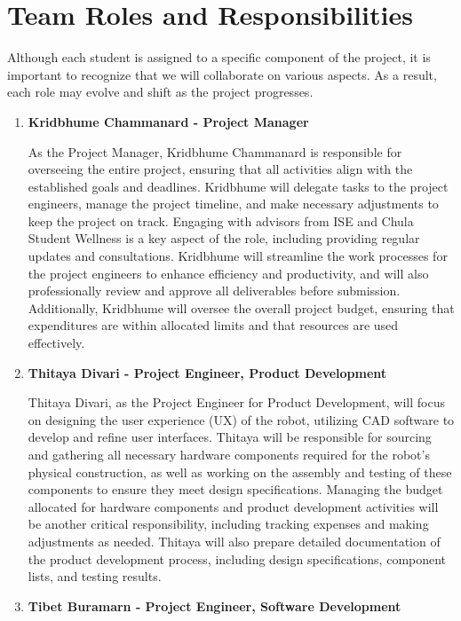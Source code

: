 \section{Team Roles and Responsibilities}

Although each student is assigned to a specific component of the project, it is important to recognize that we will collaborate on various aspects. As a result, each role may evolve and shift as the project progresses.
\begin{enumerate}
    \item{\textbf{Kridbhume Chammanard - Project Manager}}
    
    As the Project Manager, Kridbhume Chammanard is responsible for overseeing the entire project, ensuring that all activities align with the established goals and deadlines. Kridbhume will delegate tasks to the project engineers, manage the project timeline, and make necessary adjustments to keep the project on track. Engaging with advisors from ISE and Chula Student Wellness is a key aspect of the role, including providing regular updates and consultations. Kridbhume will streamline the work processes for the project engineers to enhance efficiency and productivity, and will also professionally review and approve all deliverables before submission. Additionally, Kridbhume will oversee the overall project budget, ensuring that expenditures are within allocated limits and that resources are used effectively.
    
    \item{\textbf{Thitaya Divari - Project Engineer, Product Development}}
    
    Thitaya Divari, as the Project Engineer for Product Development, will focus on designing the user experience (UX) of the robot, utilizing CAD software to develop and refine user interfaces. Thitaya will be responsible for sourcing and gathering all necessary hardware components required for the robot’s physical construction, as well as working on the assembly and testing of these components to ensure they meet design specifications. Managing the budget allocated for hardware components and product development activities will be another critical responsibility, including tracking expenses and making adjustments as needed. Thitaya will also prepare detailed documentation of the product development process, including design specifications, component lists, and testing results.
    
    \item{\textbf{Tibet Buramarn - Project Engineer, Software Development}}
    

\end{enumerate}
